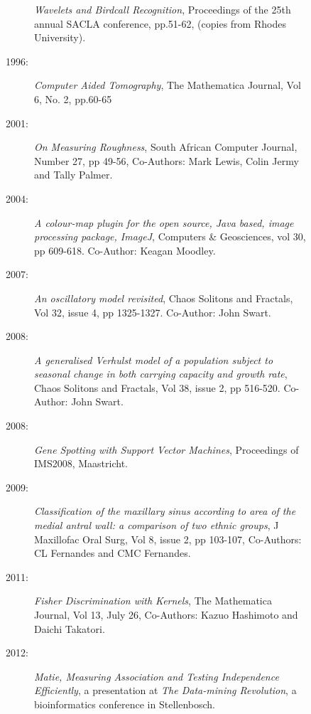 \begin{description}
\begin{description}
\begin{description}
       {\it Wavelets and Birdcall Recognition},
       Proceedings of the 25th annual SACLA conference,
       pp.51-62, (copies from Rhodes University).\newline
\item[1996:]
      {\it Computer Aided Tomography},
      The Mathematica Journal, Vol 6, No. 2, pp.60-65 \newline
\item[2001:]
      {\it On Measuring Roughness}, South African Computer Journal,
      Number 27, pp 49-56, Co-Authors:
      Mark Lewis, Colin Jermy and Tally Palmer. \newline
 \item[2004:]
      {\it A colour-map plugin for the open source, Java based,
      image processing package, ImageJ},
      Computers \& Geosciences, vol 30, pp 609-618.
      Co-Author: Keagan Moodley. \newline
\item[2007:]
      {\it An oscillatory model revisited},
      Chaos Solitons and Fractals, Vol 32, issue 4, pp 1325-1327.
      Co-Author: John Swart. \newline
\item[2008:]
      {\it A generalised Verhulst model of a population
      subject to seasonal change in both carrying capacity
      and growth rate},
      Chaos Solitons and Fractals, Vol 38, issue 2, pp 516-520.
      Co-Author: John Swart. 
\item[2008:]
      {\it Gene Spotting with Support Vector Machines},
      Proceedings of IMS2008,
      Maastricht. \newline
\item[2009:]
      {\it Classification of the maxillary sinus
      according to area of the medial antral wall:
      a comparison of two ethnic groups},
      J Maxillofac Oral Surg, Vol 8, issue 2, pp 103-107,
      Co-Authors: CL Fernandes and CMC Fernandes. \newline
\item[2011:]
      {\it Fisher Discrimination with Kernels},
      The Mathematica Journal, Vol 13, July 26,
      Co-Authors: Kazuo Hashimoto and Daichi Takatori. \newline
\item[2012:]
       {\it Matie, Measuring Association and Testing Independence Efficiently},
       a presentation at {\it The Data-mining Revolution}, a bioinformatics conference in Stellenbosch. 

\end{description}
\end{description}
\end{description}
